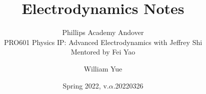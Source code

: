 \documentclass[11pt, oneside]{scrbook}
\begin{document}
\title{Electrodynamics Notes}
\subtitle{Phillips Academy Andover\\
PRO601 Physics IP: Advanced Electrodynamics with Jeffrey Shi\\
Mentored by Fei Yao}
\author{William Yue}
\date{Spring 2022, v.$\alpha$.20220326}
\maketitle




\end{document}
